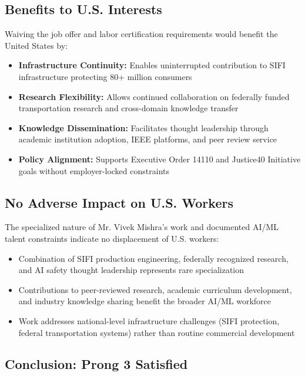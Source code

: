 \documentclass[11pt]{article}
\newcommand{\drs}{Mr. Vivek Mishra's }
\begin{document}
\subsection{Benefits to U.S. Interests}

Waiving the job offer and labor certification requirements would benefit the United States by:

\begin{itemize}
    \item \textbf{Infrastructure Continuity:} Enables uninterrupted contribution to SIFI infrastructure protecting 80+ million consumers
    \item \textbf{Research Flexibility:} Allows continued collaboration on federally funded transportation research and cross-domain knowledge transfer
    \item \textbf{Knowledge Dissemination:} Facilitates thought leadership through academic institution adoption, IEEE platforms, and peer review service
    \item \textbf{Policy Alignment:} Supports Executive Order 14110 and Justice40 Initiative goals without employer-locked constraints
\end{itemize}

\subsection{No Adverse Impact on U.S. Workers}

The specialized nature of \drs work and documented AI/ML talent constraints indicate no displacement of U.S. workers:

\begin{itemize}
    \item Combination of SIFI production engineering, federally recognized research, and AI safety thought leadership represents rare specialization
    \item Contributions to peer-reviewed research, academic curriculum development, and industry knowledge sharing benefit the broader AI/ML workforce
    \item Work addresses national-level infrastructure challenges (SIFI protection, federal transportation systems) rather than routine commercial development
\end{itemize}

\subsection{Conclusion: Prong 3 Satisfied}
\end{document}
